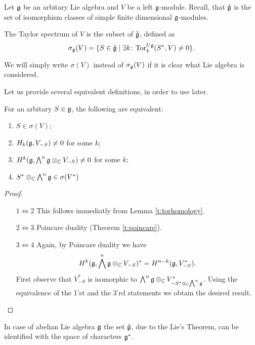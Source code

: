 Let $\mathfrak{g}$ be an arbitary Lie algebra and $V$ be a left $\mathfrak{g}$-module.  Recall, that $\hat{\mathfrak{g}}$
is the set of isomorphism classes of simple finite dimensional $\mathfrak{g}$-modules.
\begin{definition}
    The Taylor spectrum of $V$ is the subset of $\hat{\mathfrak{g}}$, defined as
    \[
        \sigma_{\mathfrak{g}}(V)=\{ S\in \hat{\mathfrak{g}} \mid \exists 
            k \colon \mathrm{Tor}^{U\mathfrak{g}}_k(S^*,V)\neq 0\}.
    \]
\end{definition}
We will simply write $\sigma(V)$ instead of $\sigma_{\mathfrak{g}}(V)$ if it is clear what Lie algebra is
considered.

Let us provide several equivalent definitions, in order to use later.
\begin{theorem}
   For an arbitary $S\in\mathfrak{g}$, the following are equivalent:
   \begin{enumerate}
       \item $S \in \sigma(V)$; 
           
       \item $H_k(\mathfrak{g}, V_{-S}) \ne 0$ for some $k$;

       \item $H^k(\mathfrak{g}, \bigwedge^n\mathfrak{g}\otimes_{\mathbb{C}} V_{-S}) \ne 0$ for some $k$;

       \item $S^* \otimes_{\mathbb{C}} \bigwedge^n\mathfrak{g} \in \sigma(V^*)$
   \end{enumerate}
\end{theorem}
\begin{proof}
    \begin{itemize}
        \item[$1 \Leftrightarrow 2$]
            This follows immediatly from Lemma \ref{t:torhomology}.

        \item[$2 \Leftrightarrow 3$]
            Poincare duality (Theorem \ref{t:poincare}).

        \item[$3 \Leftrightarrow 4$]
            Again, by Poincare duality we have
            \[
                H^k(\mathfrak{g}, \bigwedge^n\mathfrak{g} \otimes_{\mathbb{C}} V_{-S})^* = H^{n - k} (\mathfrak{g}, V_{-S}^*).
            \]
            First observe that $V^*_{-S}$ is isomorphic to $\bigwedge^n\mathfrak{g} \otimes_{\mathbb{C}}
            V^*_{-S^* \otimes_{\mathbb{C}} \bigwedge^n\mathfrak{g}}$. Using the equivalence of the 1'st and the
            3'rd statements we obtain the desired result. 
    \end{itemize}
\end{proof}
    In case of abelian Lie algebra $\mathfrak{g}$ the set $\hat{\mathfrak{g}}$, due to the Lie's Theorem, can be
    identified with the space of characters $\mathfrak{g}^*$. 
